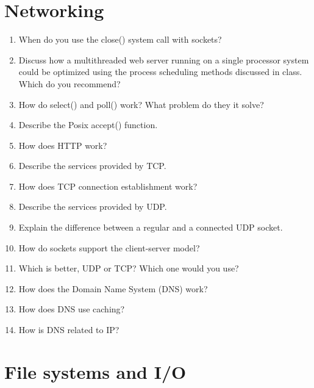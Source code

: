 \documentclass[11pt]{article}
\begin{document}
\section{Networking}
\label{sec-16}

\begin{enumerate}
\item When do you use the close() system call with sockets?
\item Discuss how a multithreaded web server running on a single
      processor system could be optimized using the process scheduling
      methods discussed in class. Which do you recommend?
\item How do select() and poll() work? What problem do they it solve?
\item Describe the Posix accept() function.
\item How does HTTP work?
\item Describe the services provided by TCP.
\item How does TCP connection establishment work?
\item Describe the services provided by UDP.
\item Explain the difference between a regular and a connected UDP socket.
\item How do sockets support the client-server model?
\item Which is better, UDP or TCP? Which one would you use?
\item How does the Domain Name System (DNS) work?
\item How does DNS use caching?
\item How is DNS related to IP?
\end{enumerate}
\section{File systems and I/O}
\label{sec-17}
\end{document}
